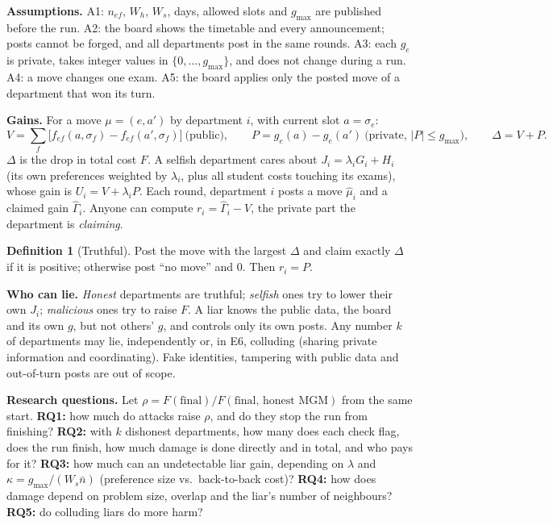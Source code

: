 \documentclass{article}
\theoremstyle{definition}
\newtheorem{definition}{Definition}
\newcommand{\1}{\mathbf{1}}
\newcommand{\gmax}{g_{\max}}
\begin{document}
\textbf{Assumptions.} A1: $n_{ef}$, $W_h$, $W_s$, days, allowed slots and $\gmax$ are published before the run. A2: the board shows the timetable and every announcement; posts cannot be forged, and all departments post in the same rounds. A3: each $g_e$ is private, takes integer values in $\{0,\dots,\gmax\}$, and does not change during a run. A4: a move changes one exam. A5: the board applies only the posted move of a department that won its turn.

\textbf{Gains.} For a move $\mu=(e,a')$ by department $i$, with current slot $a=\sigma_e$:
\begin{equation}
V=\textstyle\sum_{f}\big[f_{ef}(a,\sigma_f)-f_{ef}(a',\sigma_f)\big]\ \text{(public)},\qquad P=g_e(a)-g_e(a')\ \text{(private, } |P|\le\gmax),\qquad \Delta=V+P.
\label{eq:gain}
\end{equation}
$\Delta$ is the drop in total cost $F$. A selfish department cares about $J_i=\lambda_iG_i+H_i$ (its own preferences weighted by $\lambda_i$, plus all student costs touching its exams), whose gain is $U_i=V+\lambda_iP$. Each round, department $i$ posts a move $\hat\mu_i$ and a claimed gain $\hat\Gamma_i$. Anyone can compute $r_i=\hat\Gamma_i-V$, the private part the department is \emph{claiming}.

\begin{definition}[Truthful]
Post the move with the largest $\Delta$ and claim exactly $\Delta$ if it is positive; otherwise post ``no move'' and $0$. Then $r_i=P$.
\end{definition}

\textbf{Who can lie.} \emph{Honest} departments are truthful; \emph{selfish} ones try to lower their own $J_i$; \emph{malicious} ones try to raise $F$. A liar knows the public data, the board and its own $g$, but not others' $g$, and controls only its own posts. Any number $k$ of departments may lie, independently or, in E6, colluding (sharing private information and coordinating). Fake identities, tampering with public data and out-of-turn posts are out of scope.

\textbf{Research questions.} Let $\rho=F(\text{final})/F(\text{final, honest MGM})$ from the same start. \textbf{RQ1:} how much do attacks raise $\rho$, and do they stop the run from finishing? \textbf{RQ2:} with $k$ dishonest departments, how many does each check flag, does the run finish, how much damage is done directly and in total, and who pays for it? \textbf{RQ3:} how much can an undetectable liar gain, depending on $\lambda$ and $\kappa=\gmax/(W_s\bar n)$ (preference size vs.\ back-to-back cost)? \textbf{RQ4:} how does damage depend on problem size, overlap and the liar's number of neighbours? \textbf{RQ5:} do colluding liars do more harm?
\end{document}
